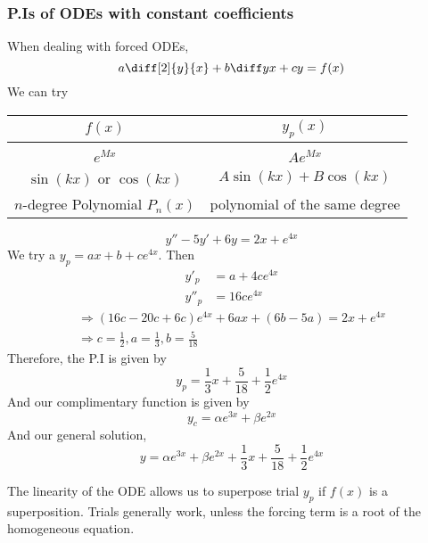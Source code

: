 \documentclass{article}
\begin{document}
\subsubsection{P.Is of ODEs with constant coefficients}
When dealing with forced ODEs,
\[
    a \diff[2]{y}{x} + b \diff yx + cy = f(x)
\]
We can try
\begin{center}
    \begin{tabular}{c | c}
        $f(x)$ & $y_p(x)$ \\
        \hline \\
        $e^{Mx}$ & $A e^{Mx}$ \\
        $\sin (kx)$ or $\cos (kx)$ & $A \sin (kx) + B \cos (kx)$ \\
        $n$-degree Polynomial $P_n(x)$ & polynomial of the same degree
    \end{tabular}
\end{center}
\begin{eg}
\[
    y'' - 5y' + 6y = 2x + e^{4x}  
\]
We try a $y_p = ax + b + c e^{4x}$. Then
\begin{align*}
    y'_p &= a + 4c e^{4x} \\
    y''_p &= 16c e^{4x}
\end{align*}
\begin{align*}
    \Rightarrow (16c - 20c + 6c)e^{4x} + 6ax + (6b - 5a) = 2x + e^{4x} \\
    \Rightarrow c = \frac{1}{2}, a = \frac{1}{3}, b = \frac{5}{18}
\end{align*}
Therefore, the P.I is given by
\[
    y_p = \frac{1}{3} x + \frac{5}{18} + \frac{1}{2} e^{4x}
\]
And our complimentary function is given by
\[
    y_c = \alpha e^{3x} + \beta e^{2x}
\]
And our general solution, 
\[
    y = \alpha e^{3x} + \beta e^{2x} + \frac{1}{3} x + \frac{5}{18} + \frac{1}{2} e^{4x}
\]
\end{eg}
The linearity of the ODE allows us to superpose trial $y_p$ if $f(x)$ is a superposition.
Trials generally work, unless the forcing term is a root of the homogeneous equation.
\end{document}
